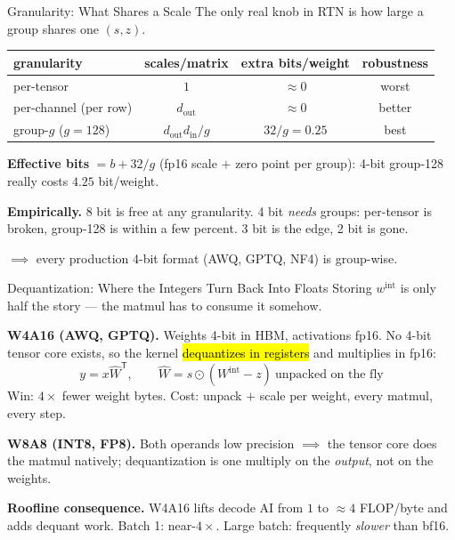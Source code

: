 \documentclass[aspectratio=169, 11pt]{beamer}
\begin{document}
\begin{frame}{Granularity: What Shares a Scale}
  The only real knob in RTN is how large a group shares one $(s, z)$.

  \vspace{-0.2em}
  \begin{table}
  \centering
  \footnotesize
  \begin{tabular}{lccc}
  \toprule
  \textbf{granularity} & \textbf{scales/matrix} & \textbf{extra bits/weight} & \textbf{robustness} \\
  \midrule
  per-tensor            & $1$                   & $\approx 0$        & worst \\
  per-channel (per row) & $d_{\text{out}}$      & $\approx 0$        & better \\
  group-$g$ ($g{=}128$) & $d_{\text{out}} d_{\text{in}} / g$ & $32/g = 0.25$ & best \\
  \bottomrule
  \end{tabular}
  \end{table}
  \vspace{-0.2em}

  \textbf{Effective bits} $= b + 32/g$ (fp16 scale $+$ zero point per group): 4-bit group-128
  really costs $4.25$ bit/weight.

  \textbf{Empirically.} 8 bit is free at any granularity. 4 bit \emph{needs} groups: per-tensor is
  broken, group-128 is within a few percent. 3 bit is the edge, 2 bit is gone.

  $\implies$ every production 4-bit format (AWQ, GPTQ, NF4) is group-wise.
\end{frame}

\begin{frame}{Dequantization: Where the Integers Turn Back Into Floats}
  Storing $w^{\text{int}}$ is only half the story --- the matmul has to consume it somehow.

  \textbf{W4A16 (AWQ, GPTQ).} Weights 4-bit in HBM, activations fp16. No 4-bit tensor core exists,
  so the kernel \hl{dequantizes in registers} and multiplies in fp16:
  \[
    y = x \hat{W}^{\mathsf{T}}, \qquad \hat{W} = s \odot (W^{\text{int}} - z) \ \text{unpacked on the fly}
  \]
  Win: $4\times$ fewer weight bytes. Cost: unpack $+$ scale per weight, every matmul, every step.

  \textbf{W8A8 (INT8, FP8).} Both operands low precision $\implies$ the tensor core does the matmul
  natively; dequantization is one multiply on the \emph{output}, not on the weights.

  \textbf{Roofline consequence.} W4A16 lifts decode AI from $1$ to $\approx 4$ FLOP/byte and adds
  dequant work. Batch 1: near-$4\times$. Large batch: frequently \emph{slower} than bf16.
\end{frame}
\end{document}
